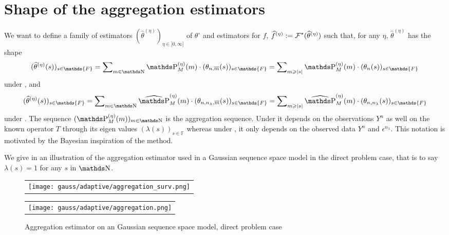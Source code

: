 \section{Shape of the aggregation estimators}\label{FREQ_GENERAL_SHAPE}\label{freq:ge:shape}

We want to define a family of estimators $(\widehat{\theta}^{(\eta)})_{\eta \in ]0, \infty]}$ of $\theta^{\circ}$ and estimators for $f$, $\widehat{f}^{(\eta)} := \operatorname{\mathcal{F}}^{\star}(\widehat{\theta}^{(\eta)})$ such that, for any $\eta$, $\widehat{\theta}^{(\eta)}$ has the shape
\begin{equation}\label{freq:ge:shape:kn}
(\widehat{\theta}^{(\eta)}(s))_{s \in \mathds{F}} = \sum\nolimits_{m \in \N} \P_{M}^{(\eta)}(m) \cdot (\theta_{n, \overline{m}}(s))_{s \in \mathds{F}} = \sum\nolimits_{m \geq \vert s \vert} \P_{M}^{(\eta)}(m) \cdot (\theta_{n}(s))_{s \in \mathds{F}}
\end{equation}
under , and
\begin{equation}\label{freq:ge:shape:uk}
(\widehat{\theta}^{(\eta)}(s))_{s \in \mathds{F}} = \sum\nolimits_{m \in \N} \widehat{\P}_{M}^{(\eta)}(m) \cdot (\theta_{n, n_{\lambda}, \overline{m}}(s))_{s \in \mathds{F}} = \sum\nolimits_{m \geq \vert s \vert} \widehat{\P}_{M}^{(\eta)}(m) \cdot (\theta_{n, n_{\lambda}}(s))_{s \in \mathds{F}}
\end{equation}
under .
The sequence $(\P_{M}^{(\eta)}(m))_{m \in \N}$ is the aggregation sequence.
Under  it depends on the observations $Y^{n}$ as well on the known operator $T$ through its eigen values $(\lambda(s))_{s \in \mathds{F}}$ whereas under , it only depends on the observed data $Y^{n}$ and $\epsilon^{n_{\lambda}}$.
This notation is motivated by the Bayesian inspiration of the method.

We give in  an illustration of the aggregation estimator used in a Gaussian sequence space model in the direct problem case, that is to say $\lambda(s) = 1$ for any $s$ in $\N$.

\begin{figure}
  \centering
  \begin{tabular}{@{}c@{}}
    \texttt{[image: gauss/adaptive/aggregation\_surv.png]} \\[\abovecaptionskip]
  \end{tabular}
  \begin{tabular}{@{}c@{}}
    \texttt{[image: gauss/adaptive/aggregation.png]} \\[\abovecaptionskip]
  \end{tabular}
  \caption{Aggregation estimator on an Gaussian sequence space model, direct problem case}
  \label{fig:ge:adaptive:aggregation}
\end{figure}

